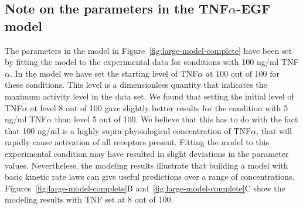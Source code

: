 \documentclass{bmcart}
\begin{document}
\subsection{Note on the parameters in the TNF$\alpha$-EGF model}\label{suppl:parameters-tnf-egf}
The parameters in the model in Figure~\ref{fig:large-model-complete}
have been set by fitting the model to the experimental data for conditions with 100 ng/ml TNF$\alpha$.
In the model we have set the starting level of TNF$\alpha$ at 100 out of 100 for these conditions.
This level is a dimensionless quantity that indicates the maximum activity level in the data set.
We found that setting the initial level of TNF$\alpha$ at level 8 out of 100 gave slightly better results for the
condition with 5 ng/ml TNF$\alpha$ than level 5 out of 100. We believe that this has to do with the fact that
100 ng/ml is a highly supra-physiological concentration of TNF$\alpha$, that will rapidly cause activation of all
receptors present. Fitting the model to this experimental condition may have resulted in slight deviations
in the parameter values. Nevertheless, the modeling results illustrate that building a model with basic
kinetic rate laws can give useful predictions over a range of concentrations. Figures~\ref{fig:large-model-complete}B and~\ref{fig:large-model-complete}C
show the modeling results with TNF set at 8 out of 100.
\end{document}
